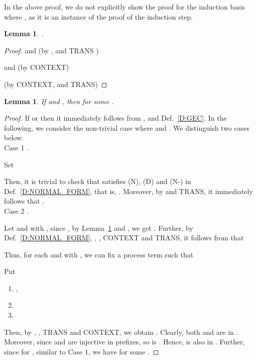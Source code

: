 \documentclass{elsarticle}
\theoremstyle{plain}
\newtheorem{lemma}[theorem]{Lemma}
\theoremstyle{definition}
\begin{document}
In the above proof, we do not  explicitly show the proof for the induction basis where , as it is an instance of the proof of the induction step.

\begin{lemma}\label{L:SP3}
      .
\end{lemma}
\begin{proof}
 and    \qquad\;\;\;\;\; (by   ,   and TRANS )

\noindent  and   \;\qquad\qquad\qquad\;  (by CONTEXT)

\noindent  \qquad\qquad\qquad (by CONTEXT,   and TRANS)
\end{proof}

\begin{lemma}\label{L:BIG_SQUARE_EC}
  If   and , then  for some .
\end{lemma}
\begin{proof}
If  or  then it immediately follows from ,  and Def.~\ref{D:GEC}.
In the following, we consider the non-trivial case where  and .
We distinguish two cases below.\\

\noindent Case 1 .

          Set
            
        Then, it is trivial to check that  satisfies (N), (D) and (N-) in Def.~\ref{D:NORMAL_FORM}, that is, .
        Moreover, by  and TRANS, it immediately follows that .\\

\noindent Case 2 .

  Let  and  with , since , by Lemma~\ref{L:SP3} and , we get .
  Further, by Def.~\ref{D:NORMAL_FORM}, , , CONTEXT and TRANS, it follows from  that
  
  Thus, for each  and  with , we can fix a process term  such that
  
  Put
    \begin{enumerate}
      \item  ,
      \item  
      \item 
    \end{enumerate}
    Then, by , , TRANS and CONTEXT, we obtain .
    Clearly, both  and  are in .
    Moreover, since  and  are injective in prefixes, so is .
    Hence,  is also in .
    Further, since  for , similar to Case 1, we have
     for some .
\end{proof}
\end{document}
